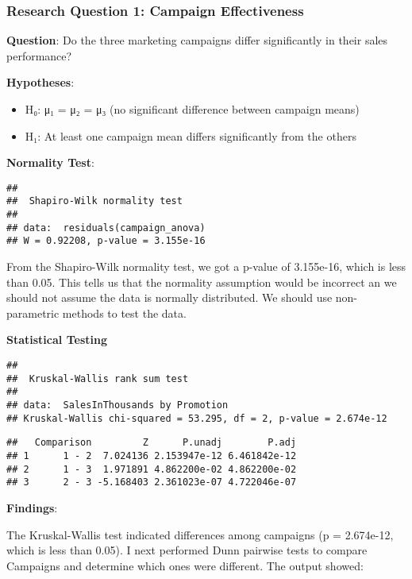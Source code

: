 \documentclass[
]{article}
\providecommand{\tightlist}{%
  \setlength{\itemsep}{0pt}\setlength{\parskip}{0pt}}
\begin{document}
\subsubsection{Research Question 1: Campaign
Effectiveness}\label{research-question-1-campaign-effectiveness}

\textbf{Question}: Do the three marketing campaigns differ significantly
in their sales performance?

\textbf{Hypotheses}:

\begin{itemize}
\tightlist
\item
  H₀: μ₁ = μ₂ = μ₃ (no significant difference between campaign means)
\item
  H₁: At least one campaign mean differs significantly from the others
\end{itemize}

\textbf{Normality Test}:

\begin{verbatim}
## 
##  Shapiro-Wilk normality test
## 
## data:  residuals(campaign_anova)
## W = 0.92208, p-value = 3.155e-16
\end{verbatim}

From the Shapiro-Wilk normality test, we got a p-value of 3.155e-16,
which is less than 0.05. This tells us that the normality assumption
would be incorrect an we should not assume the data is normally
distributed. We should use non-parametric methods to test the data.

\textbf{Statistical Testing}

\begin{verbatim}
## 
##  Kruskal-Wallis rank sum test
## 
## data:  SalesInThousands by Promotion
## Kruskal-Wallis chi-squared = 53.295, df = 2, p-value = 2.674e-12
\end{verbatim}

\begin{verbatim}
##   Comparison         Z      P.unadj        P.adj
## 1      1 - 2  7.024136 2.153947e-12 6.461842e-12
## 2      1 - 3  1.971891 4.862200e-02 4.862200e-02
## 3      2 - 3 -5.168403 2.361023e-07 4.722046e-07
\end{verbatim}

\textbf{Findings}:

The Kruskal-Wallis test indicated differences among campaigns (p =
2.674e-12, which is less than 0.05). I next performed Dunn pairwise
tests to compare Campaigns and determine which ones were different. The
output showed:
\end{document}

